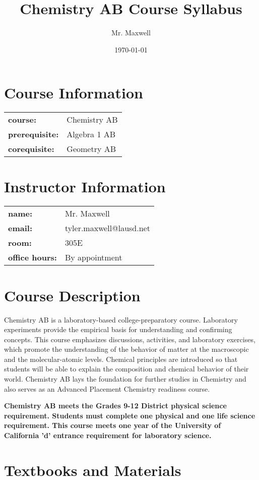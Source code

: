 \documentclass[11pt]{article}
\author{Mr. Maxwell}
\date{\today}
\title{Chemistry AB Course Syllabus}
\begin{document}
\maketitle
\tableofcontents

\section{Course Information}
\label{sec:org878012e}
\begin{tabular}{ll}
\textbf{course:} & Chemistry AB\\
\textbf{prerequisite:} & Algebra 1 AB\\
\textbf{corequisite:} & Geometry AB\\
\end{tabular}
\section{Instructor Information}
\label{sec:org7212935}
\begin{tabular}{ll}
\textbf{name:} & Mr. Maxwell\\
\textbf{email:} & tyler.maxwell@lausd.net\\
\textbf{room:} & 305E\\
\textbf{office hours:} & By appointment\\
\end{tabular}
\section{Course Description}
\label{sec:orgf7cf0b5}
Chemistry AB is a laboratory-based college-preparatory course. Laboratory experiments provide the empirical basis for understanding and confirming concepts. This course emphasizes discussions, activities, and laboratory exercises, which promote the understanding of the behavior of matter at the macroscopic and the molecular-atomic levels. Chemical principles are introduced so that students will be able to explain the composition and chemical behavior of their world. Chemistry AB lays the foundation for further studies in Chemistry and also serves as an Advanced Placement Chemistry readiness course. 

\textbf{Chemistry AB meets the Grades 9-12 District physical science requirement. Students must complete one physical and one life science requirement. This course meets one year of the University of California 'd' entrance requirement for laboratory science.}
\section{Textbooks and Materials}
\label{sec:orgfd7bdc5}
\end{document}
